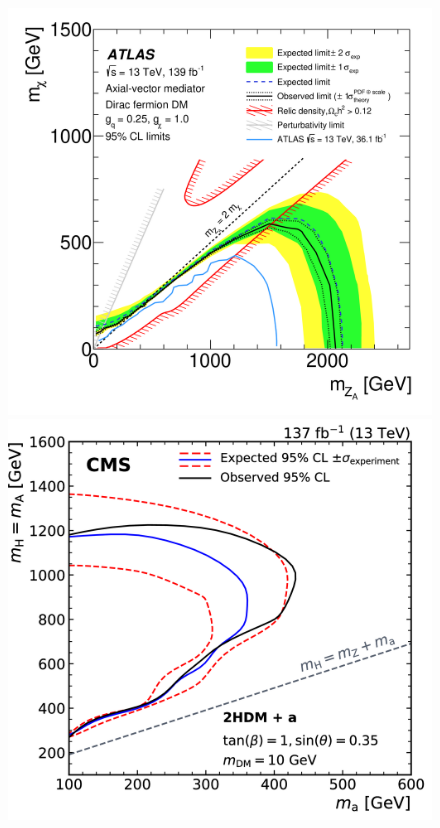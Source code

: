 \documentclass{moriond}
\begin{document}
\begin{figure} [htb]
\begin{minipage}{0.45\linewidth}
\centerline{\includegraphics[width=0.9\linewidth]{monojet}}
\end{minipage}
\begin{minipage}{0.45\linewidth}
\centerline{\includegraphics[width=0.9\linewidth]{monoz}}
\end{minipage}
\caption[]{}
\label{fig:mono_jet_z}
\end{figure}
\end{document}

